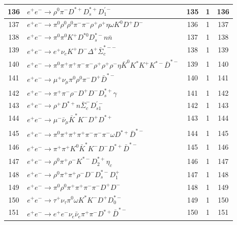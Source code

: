 \documentclass[landscape]{article}
\begin{document}
\begin{table}[htbp!]
\begin{tabular}{|c|>{\centering}p{18cm}|c|c|c|}
\hline
136 & $ e^{+} e^{-} \rightarrow \rho^{0} \pi^{-} D^{*+} D_{s}^{*+} D_{1}^{\prime-} $ & 135 & 1 & 136 \\
\hline
137 & $ e^{+} e^{-} \rightarrow \pi^{0} \rho^{0} \rho^{0} \pi^{-} \pi^{-} \rho^{+} \rho^{+} \eta \omega K^{0} D^{+} D^{-} $ & 136 & 1 & 137 \\
\hline
138 & $ e^{+} e^{-} \rightarrow \pi^{0} \pi^{0} K^{+} D^{*0} D_{s}^{*-} n \bar{n} $ & 137 & 1 & 138 \\
\hline
139 & $ e^{+} e^{-} \rightarrow e^{+} \nu_{e} K^{+} D^{-} \Delta^{+} \bar{\Sigma}_{c}^{*--} $ & 138 & 1 & 139 \\
\hline
140 & $ e^{+} e^{-} \rightarrow \pi^{0} \pi^{+} \pi^{+} \pi^{-} \pi^{-} \rho^{+} \rho^{+} \rho^{-} \eta \bar{K}^{0} K^{*} K^{+} K^{*-} \bar{D}^{*-} $ & 139 & 1 & 140 \\
\hline
141 & $ e^{+} e^{-} \rightarrow \mu^{+} \nu_{\mu} \pi^{0} \rho^{0} \pi^{-} D^{+} \bar{D}^{*-} $ & 140 & 1 & 141 \\
\hline
142 & $ e^{+} e^{-} \rightarrow \pi^{+} \pi^{-} \rho^{-} D^{+} D^{-} D_{s}^{*+} \gamma $ & 141 & 1 & 142 \\
\hline
143 & $ e^{+} e^{-} \rightarrow \rho^{+} D^{*+} n \bar{\Sigma}_{c}^{-} D_{s1}^{\prime-} $ & 142 & 1 & 143 \\
\hline
144 & $ e^{+} e^{-} \rightarrow \mu^{-} \bar{\nu}_{\mu} \bar{K}^{*} K^{-} D^{+} D^{*+} $ & 143 & 1 & 144 \\
\hline
145 & $ e^{+} e^{-} \rightarrow \pi^{0} \pi^{+} \pi^{+} \pi^{+} \pi^{-} \pi^{-} \pi^{-} \omega D^{*+} \bar{D}^{*-} $ & 144 & 1 & 145 \\
\hline
146 & $ e^{+} e^{-} \rightarrow \pi^{+} \pi^{+} K^{0} \bar{K}^{*} K^{-} D^{-} D^{*+} \bar{D}^{*-} $ & 145 & 1 & 146 \\
\hline
147 & $ e^{+} e^{-} \rightarrow \rho^{0} \pi^{+} \rho^{-} K^{*-} D_{2}^{*+} \eta_{c} $ & 146 & 1 & 147 \\
\hline
148 & $ e^{+} e^{-} \rightarrow \rho^{0} \pi^{+} \pi^{+} \rho^{-} D^{-} D_{s}^{*-} D_{1}^{+} $ & 147 & 1 & 148 \\
\hline
149 & $ e^{+} e^{-} \rightarrow \pi^{0} \rho^{0} \pi^{+} \pi^{+} \pi^{-} \pi^{-} D^{+} D^{-} $ & 148 & 1 & 149 \\
\hline
150 & $ e^{+} e^{-} \rightarrow \tau^{+} \nu_{\tau} \pi^{0} \omega K^{*} K^{-} D^{+} D_{0}^{*-} $ & 149 & 1 & 150 \\
\hline
151 & $ e^{+} e^{-} \rightarrow e^{+} e^{-} \nu_{e} \bar{\nu}_{e} \pi^{+} \pi^{-} D^{*+} \bar{D}^{*-} $ & 150 & 1 & 151 \\

\end{tabular}
\end{table}
\end{document}
